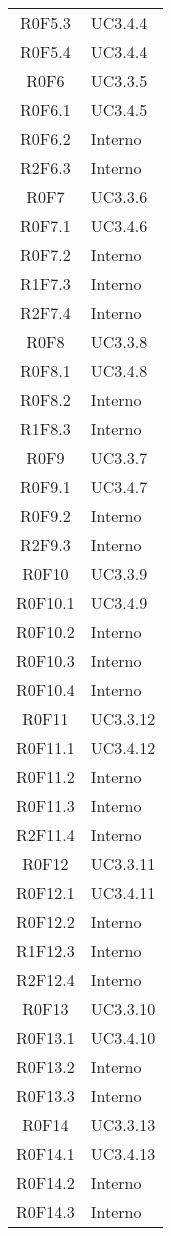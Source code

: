\begin{center}
\begin{longtable}{ c m{3cm} }
   R0F5.3 & UC3.4.4 \\
   R0F5.4 & UC3.4.4 \\
   R0F6 & UC3.3.5 \\
   R0F6.1 & UC3.4.5 \\
   R0F6.2 & Interno \\
   R2F6.3 & Interno \\
   R0F7 & UC3.3.6 \\
   R0F7.1 & UC3.4.6 \\
   R0F7.2 & Interno \\
   R1F7.3 & Interno \\
   R2F7.4 & Interno \\ 
   R0F8 & UC3.3.8 \\
   R0F8.1 & UC3.4.8 \\
   R0F8.2 & Interno \\
   R1F8.3 & Interno \\
   R0F9 & UC3.3.7 \\
   R0F9.1 & UC3.4.7 \\
   R0F9.2 & Interno \\
   R2F9.3 & Interno \\
   R0F10 & UC3.3.9 \\
   R0F10.1 & UC3.4.9 \\
   R0F10.2 & Interno \\
   R0F10.3 & Interno \\
   R0F10.4 & Interno \\
   R0F11 & UC3.3.12 \\
   R0F11.1 & UC3.4.12 \\
   R0F11.2 & Interno \\
   R0F11.3 & Interno \\
   R2F11.4 & Interno \\
   R0F12 & UC3.3.11 \\
   R0F12.1 & UC3.4.11 \\
   R0F12.2 & Interno \\
   R1F12.3 & Interno \\
   R2F12.4 & Interno \\
   R0F13 & UC3.3.10 \\
   R0F13.1 & UC3.4.10 \\
   R0F13.2 & Interno \\
   R0F13.3 & Interno \\
   R0F14 & UC3.3.13 \\
   R0F14.1 & UC3.4.13 \\
   R0F14.2 & Interno \\
   R0F14.3 & Interno \\

\end{longtable}
\end{center}
